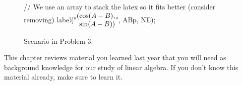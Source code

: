 \documentclass[../textbook.tex]{subfiles}
\begin{document}
\begin{figure}[h]
\begin{center}
\begin{minipage}[b]{\textwidth}
\begin{asy}[width=0.5\textwidth]
				// We use an array to stack the latex so it fits better (consider removing)
				label("$\arraycolsep=0pt \begin{array}{rl} (& \cos (A-B), \\ & \sin (A-B)) \end{array}$", ABp, NE);
			\end{asy}
		\end{minipage}
	\end{center}
	\vspace*{-2\baselineskip}
	\begin{center}
		\begin{minipage}[t]{\textwidth}
			\caption{Scenario in Problem 3.}
			\label{fig:unit_circle}
		\end{minipage}\hfill
	\end{center}
	\vspace*{-2\baselineskip}
\end{figure}

\noindent This chapter reviews material you learned last year that you will need as background knowledge for our study of linear algebra. If you don't know this material already, make sure to learn it.
\end{document}
